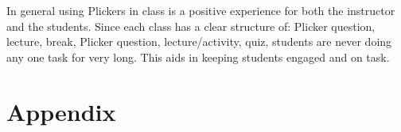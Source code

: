 \documentclass[12pt]{article}
\begin{document}
In general using Plickers in class is a positive experience for both the instructor and the students. Since each class has a clear structure of: Plicker question, lecture, break, Plicker question, lecture/activity, quiz, students are never doing any one task for very long. This aids in keeping students engaged and on task.


\vspace{4\baselineskip}\vspace{-\parskip} %
\footnotesize %



\section*{Appendix}
\end{document}
